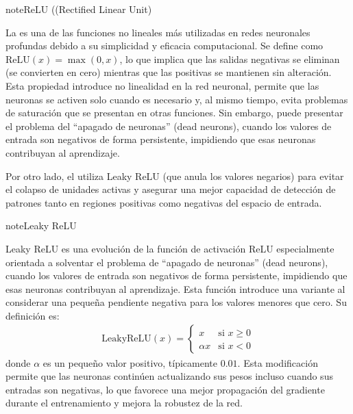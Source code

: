 \documentclass[a4paper,10pt,spanish]{jupyterBook}
\begin{document}
\begin{sphinxadmonition}{note}{ReLU ((Rectified Linear Unit)}

\sphinxAtStartPar
La  es una de las funciones no lineales más utilizadas en redes neuronales profundas debido a su simplicidad y eficacia computacional. Se define como \(\text{ReLU}(x) = \max(0, x)\), lo que implica que las salidas negativas se eliminan (se convierten en cero) mientras que las positivas se mantienen sin alteración. Esta propiedad introduce no linealidad en la red neuronal, permite que las neuronas se activen solo cuando es necesario y, al mismo tiempo, evita problemas de saturación que se presentan en otras funciones. Sin embargo,  puede presentar el problema del “apagado de neuronas” (dead neurons), cuando los valores de entrada son negativos de forma persistente, impidiendo que esas neuronas contribuyan al aprendizaje.
\end{sphinxadmonition}

\sphinxAtStartPar
Por otro lado, el  utiliza Leaky ReLU (que anula los valores negarios) para evitar el colapso de unidades activas y asegurar una mejor capacidad de detección de patrones tanto en regiones positivas como negativas del espacio de entrada.

\begin{sphinxadmonition}{note}{Leaky ReLU}

\sphinxAtStartPar
Leaky ReLU es una evolución de la función de activación ReLU especialmente orientada a solventar el problema de “apagado de neuronas” (dead neurons), cuando los valores de entrada son negativos de forma persistente, impidiendo que esas neuronas contribuyan al aprendizaje. Esta función introduce una variante al considerar una pequeña pendiente negativa para los valores menores que cero. Su definición es:
\begin{equation*}
\begin{split}
\text{LeakyReLU}(x) =
\begin{cases}
x & \text{si } x \geq 0 \\
\alpha x & \text{si } x < 0
\end{cases}
\end{split}
\end{equation*}
\sphinxAtStartPar
donde \(\alpha\) es un pequeño valor positivo, típicamente \(0.01\). Esta modificación permite que las neuronas continúen actualizando sus pesos incluso cuando sus entradas son negativas, lo que favorece una mejor propagación del gradiente durante el entrenamiento y mejora la robustez de la red.
\end{sphinxadmonition}
\end{document}
